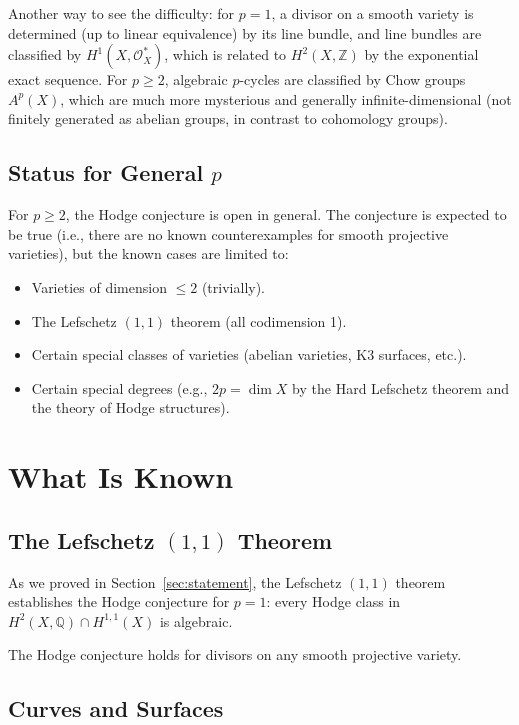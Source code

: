 Another way to see the difficulty: for $p = 1$, a divisor on a smooth variety is determined (up to linear equivalence) by its line bundle, and line bundles are classified by $H^1(X, \mathcal{O}_X^*)$, which is related to $H^2(X, \mathbb{Z})$ by the exponential exact sequence. For $p \ge 2$, algebraic $p$-cycles are classified by Chow groups $A^p(X)$, which are much more mysterious and generally infinite-dimensional (not finitely generated as abelian groups, in contrast to cohomology groups).

\subsection{Status for General $p$}

For $p \ge 2$, the Hodge conjecture is open in general. The conjecture is expected to be true (i.e., there are no known counterexamples for smooth projective varieties), but the known cases are limited to:
\begin{itemize}
\item Varieties of dimension $\le 2$ (trivially).
\item The Lefschetz $(1,1)$ theorem (all codimension 1).
\item Certain special classes of varieties (abelian varieties, K3 surfaces, etc.).
\item Certain special degrees (e.g., $2p = \dim X$ by the Hard Lefschetz theorem and the theory of Hodge structures).
\end{itemize}

\section{What Is Known}
\label{sec:known}

\subsection{The Lefschetz $(1,1)$ Theorem}

As we proved in Section~\ref{sec:statement}, the Lefschetz $(1,1)$ theorem establishes the Hodge conjecture for $p = 1$: every Hodge class in $H^2(X, \mathbb{Q}) \cap H^{1,1}(X)$ is algebraic.

\begin{corollary}
The Hodge conjecture holds for divisors on any smooth projective variety.
\end{corollary}

\subsection{Curves and Surfaces}

